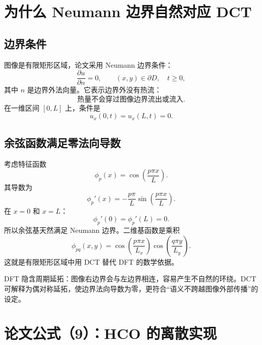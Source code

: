 \documentclass[UTF8,12pt,a4paper,fontset=none]{ctexart}
\numberwithin{equation}{section}
\newcommand{\pd}{\partial}
\begin{document}
\section{为什么 Neumann 边界自然对应 DCT}

\subsection{边界条件}

图像是有限矩形区域，论文采用 Neumann 边界条件：
\begin{equation}
  \frac{\pd u}{\pd n}=0,
  \qquad (x,y)\in\pd D,
  \quad t\ge0,
  \label{eq:neumann}
\end{equation}
其中 $n$ 是边界外法向量。它表示边界外没有热流：
\begin{equation}
  \text{热量不会穿过图像边界流出或流入}.
\end{equation}
在一维区间 $[0,L]$ 上，条件是
\begin{equation}
  u_x(0,t)=u_x(L,t)=0.
\end{equation}

\subsection{余弦函数满足零法向导数}

考虑特征函数
\begin{equation}
  \phi_p(x)=\cos\left(\frac{p\pi x}{L}\right).
\end{equation}
其导数为
\begin{equation}
  \phi_p'(x)
  =-\frac{p\pi}{L}
  \sin\left(\frac{p\pi x}{L}\right).
\end{equation}
在 $x=0$ 和 $x=L$：
\begin{equation}
  \phi_p'(0)=\phi_p'(L)=0.
\end{equation}
所以余弦基天然满足 Neumann 边界。二维基函数是乘积
\begin{equation}
  \phi_{pq}(x,y)
  =\cos\left(\frac{p\pi x}{L_x}\right)
  \cos\left(\frac{q\pi y}{L_y}\right).
\end{equation}
这就是有限矩形区域中用 DCT 替代 DFT 的数学依据。

\begin{keybox}[边界的直观含义]
DFT 隐含周期延拓：图像右边界会与左边界相连，容易产生不自然的环绕。DCT 可解释为偶对称延拓，使边界法向导数为零，更符合“语义不跨越图像外部传播”的设定。
\end{keybox}

\section{论文公式（9）：HCO 的离散实现}
\end{document}
